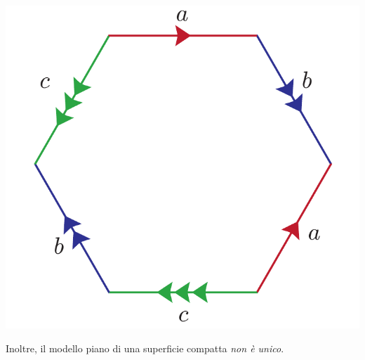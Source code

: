 \begin{observe}
\begin{center}
	\includegraphics[trim=0cm 0cm 0cm 0cm, clip, scale=0.375]{images/modellopiano.pdf}
\end{center}
 Inoltre, il modello piano di una superficie compatta \textit{non è unico}.
\end{observe}

